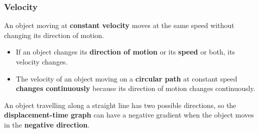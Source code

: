 \subsubsection*{Velocity}

An object moving at \textbf{constant velocity} moves at the same speed without changing its direction of motion.
\begin{itemize}
    \item If an object changes its \textbf{direction of motion} or its \textbf{speed} or both, its velocity changes.
    \item The velocity of an object moving on a \textbf{circular path} at constant speed \textbf{changes continuously} because its direction of motion changes continuously.
\end{itemize}

An object travelling along a straight line has two possible directions, so the \textbf{displacement-time graph} can have a negative gradient when the object moves in the \textbf{negative direction}.

